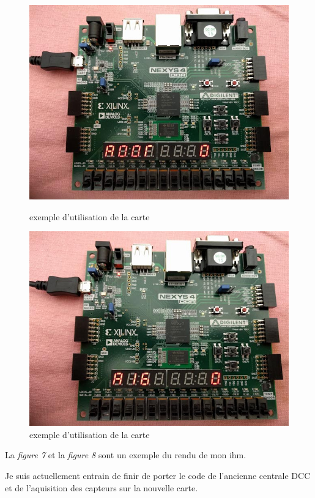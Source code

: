 \begin{figure}[ht]
    \begin{minipage}[c]{.46\linewidth}
        \centering
        \includegraphics[scale=0.25]{exe_add.jpg}
        \caption{exemple d'utilisation de la carte}
        \label{fig7}
    \end{minipage}
    \hfill%
    \begin{minipage}[c]{.46\linewidth}
        \centering
        \includegraphics[scale=0.25]{exe_aigui.jpg}
        \caption{exemple d'utilisation de la carte}
        \label{fig8}
    \end{minipage}
\end{figure}

La \emph{figure 7} et la \emph{figure 8} sont un exemple du rendu de
mon ihm.

Je suis actuellement entrain de finir de porter le code de l'ancienne
centrale DCC et de l'aquisition des capteurs sur la nouvelle carte.

\newpage





